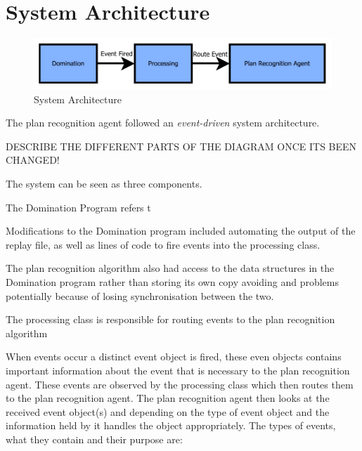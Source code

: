 \documentclass[parskip]{cs4rep}
\begin{document}
\section{System Architecture}

\begin{figure}[h]
\centerline{
\includegraphics{images/event-driven-architecture}
}
\caption{System Architecture}
\end{figure} 

The plan recognition agent followed an \textit{event-driven} system architecture.

DESCRIBE THE DIFFERENT PARTS OF THE DIAGRAM ONCE ITS BEEN CHANGED!

The system can be seen as three components.

The Domination Program refers t

Modifications to the Domination program included automating the output of the replay file, as well as lines of code to fire events into the processing class.

The plan recognition algorithm also had access to the data structures in the Domination program rather than storing its own copy avoiding and problems potentially because of losing synchronisation between the two.

The processing class is responsible for routing events to the plan recognition algorithm 

When events occur a distinct event object is fired, these even objects contains important information about the event that is necessary to the plan recognition agent. These events are observed by the processing class which then routes them to the plan recognition agent. The plan recognition agent then looks at the received event object(s) and depending on the type of event object and the information held by it handles the object appropriately. The types of events, what they contain and their purpose are:
\end{document}
